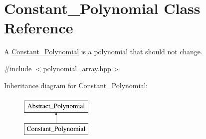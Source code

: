 \hypertarget{class_constant___polynomial}{}\section{Constant\+\_\+\+Polynomial Class Reference}
\label{class_constant___polynomial}


A \hyperlink{class_constant___polynomial}{Constant\+\_\+\+Polynomial} is a polynomial that should not change.  




{\ttfamily \#include $<$polynomial\+\_\+array.\+hpp$>$}

Inheritance diagram for Constant\+\_\+\+Polynomial\+:\begin{figure}[H]
\begin{center}
\leavevmode
\includegraphics[height=2.000000cm]{class_constant___polynomial}
\end{center}
\end{figure}

